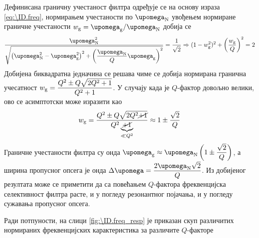 Дефинисана граничну учестаност филтра одређује се на основу израза \ref{eq:\ID.freq}, нормирањем учестаности 
по $\upomega_{\rm N}$ увођењем нормиране граничне учестаности $w_{\rm g} = \upomega_{\rm g}/\upomega_{\rm N}$ добија се 
\begin{equation}
    \dfrac{\upomega_{\rm N}^2}{\sqrt{  
        \left(\upomega_{\rm N}^2 - \upomega_{\rm g}^2\right)^2 
        +
        \left(
            \dfrac{\upomega_{\rm N}}{Q} \upomega_{\rm g}
        \right)^2
    }} = \dfrac{1}{\sqrt2} 
    \Rightarrow
    (1 - w_{\rm g}^2)^2 + \left( \dfrac{w_{\rm g}}{Q} \right)^2 = 2
\end{equation}
Добијена биквадратна једначина се решава чиме се добија нормирана гранична учесатност
$
    w_{\rm g} = \dfrac{Q^2 \pm Q \sqrt{2Q^2 + 1}}{Q^2 + 1}
$. 
У случају када је $Q$-фактор довољно велики, ово се асимптотски може изразити као 
\begin{equation}
    w_{\rm g} = \dfrac{Q^2 \pm Q \sqrt{2Q^2 \cancel{+ 1}    }}{{Q^2 \underbrace{\cancel{+ 1}}_{\ll Q^2}  } }
    \approx 1 \pm \dfrac{\sqrt 2}{Q}
\end{equation}
Граничне учестаности филтра су онда $\upomega_{\rm g} \approx \upomega_{\rm N}
\left(  1 \pm \dfrac{\sqrt 2}{Q} \right)$, а ширина пропусног опсега је онда 
$\Delta \upomega = \dfrac{2\upomega_{\rm N}\sqrt 2}{Q}$. Из добијеног резултата може се приметити да са повећањем 
$Q$-фактора фреквенцијска селективност филтра расте, и у погледу резонантног појачања, и у погледу сужавања пропусног 
опсега.

Ради потпуности, на слици \ref{fig:\ID.freq_resp} је приказан скуп различитих нормираних фреквенцијских карактеристика
за различите $Q$-факторе

